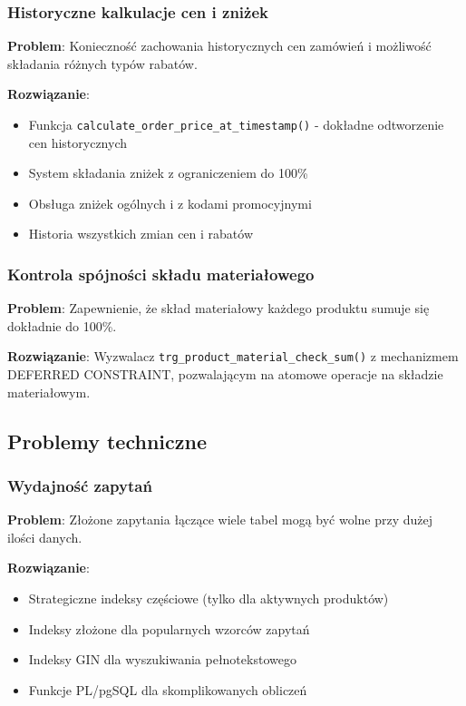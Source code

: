 \subsubsection*{Historyczne kalkulacje cen i zniżek}
\textbf{Problem}: Konieczność zachowania historycznych cen zamówień i możliwość składania różnych typów rabatów.

\textbf{Rozwiązanie}:
\begin{itemize}
    \item Funkcja \texttt{calculate\_order\_price\_at\_timestamp()} - dokładne odtworzenie cen historycznych
    \item System składania zniżek z ograniczeniem do 100\%
    \item Obsługa zniżek ogólnych i z kodami promocyjnymi
    \item Historia wszystkich zmian cen i rabatów
\end{itemize}

\subsubsection*{Kontrola spójności składu materiałowego}
\textbf{Problem}: Zapewnienie, że skład materiałowy każdego produktu sumuje się dokładnie do 100\%.

\textbf{Rozwiązanie}: Wyzwalacz \texttt{trg\_product\_material\_check\_sum()} z mechanizmem DEFERRED CONSTRAINT, pozwalającym na atomowe operacje na składzie materiałowym.

\subsection*{Problemy techniczne}

\subsubsection*{Wydajność zapytań}
\textbf{Problem}: Złożone zapytania łączące wiele tabel mogą być wolne przy dużej ilości danych.

\textbf{Rozwiązanie}:
\begin{itemize}
    \item Strategiczne indeksy częściowe (tylko dla aktywnych produktów)
    \item Indeksy złożone dla popularnych wzorców zapytań
    \item Indeksy GIN dla wyszukiwania pełnotekstowego
    \item Funkcje PL/pgSQL dla skomplikowanych obliczeń
\end{itemize}

